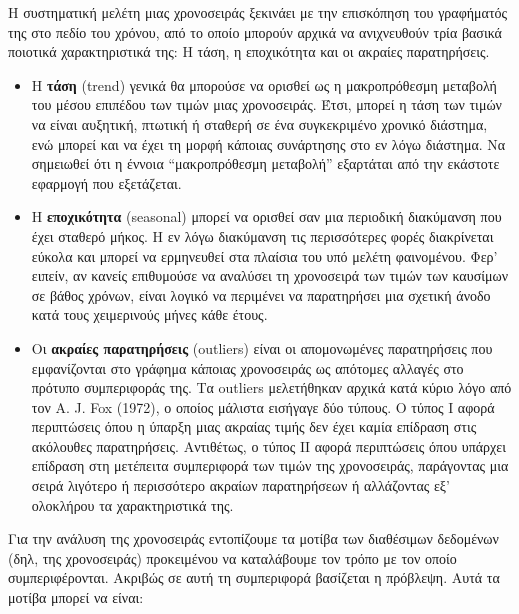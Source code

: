 Η συστηματική μελέτη μιας χρονοσειράς ξεκινάει με την επισκόπηση του
γραφήματός της στο πεδίο του χρόνου, από το οποίο μπορούν αρχικά να ανιχνευθούν
τρία βασικά ποιοτικά χαρακτηριστικά της: Η τάση, η εποχικότητα και οι ακραίες
παρατηρήσεις.\\
\begin{itemize}

\item Η \textbf{τάση} (trend) γενικά θα μπορούσε να ορισθεί ως η μακροπρόθεσμη μεταβολή του
μέσου επιπέδου των τιμών μιας χρονοσειράς. Έτσι, μπορεί η τάση των τιμών να είναι
αυξητική, πτωτική ή σταθερή σε ένα συγκεκριμένο χρονικό διάστημα, ενώ μπορεί και να
έχει τη μορφή κάποιας συνάρτησης στο εν λόγω διάστημα. Να σημειωθεί ότι η έννοια
“μακροπρόθεσμη μεταβολή” εξαρτάται από την εκάστοτε εφαρμογή που εξετάζεται.
\item Η \textbf{εποχικότητα} (seasonal) μπορεί να ορισθεί σαν μια περιοδική διακύμανση που έχει
σταθερό μήκος. Η εν λόγω διακύμανση τις περισσότερες φορές διακρίνεται εύκολα και
μπορεί να ερμηνευθεί στα πλαίσια του υπό μελέτη φαινομένου. Φερ' ειπείν, αν
κανείς επιθυμούσε να αναλύσει τη χρονοσειρά των τιμών των καυσίμων σε βάθος
χρόνων, είναι λογικό να περιμένει να παρατηρήσει μια σχετική άνοδο κατά τους
χειμερινούς μήνες κάθε έτους.

\item Οι \textbf{ακραίες παρατηρήσεις} (outliers) είναι οι απομονωμένες παρατηρήσεις που
εμφανίζονται στο γράφημα κάποιας χρονοσειράς ως απότομες αλλαγές στο πρότυπο
συμπεριφοράς της. Τα outliers μελετήθηκαν αρχικά κατά κύριο λόγο από τον A. J. Fox
(1972), ο οποίος μάλιστα εισήγαγε δύο τύπους. Ο τύπος I αφορά περιπτώσεις όπου η
ύπαρξη μιας ακραίας τιμής δεν έχει καμία επίδραση στις ακόλουθες παρατηρήσεις.
Αντιθέτως, ο τύπος ΙΙ αφορά περιπτώσεις όπου υπάρχει επίδραση στη μετέπειτα
συμπεριφορά των τιμών της χρονοσειράς, παράγοντας μια σειρά λιγότερο ή περισσότερο
ακραίων παρατηρήσεων ή αλλάζοντας εξ’ ολοκλήρου τα χαρακτηριστικά της.
\end{itemize}
Για την ανάλυση της χρονοσειράς εντοπίζουμε τα μοτίβα των διαθέσιμων δεδομένων
(δηλ, της χρονοσειράς) προκειμένου να καταλάβουμε τον τρόπο με τον οποίο
συμπεριφέρονται. Ακριβώς σε αυτή τη συμπεριφορά βασίζεται η πρόβλεψη. Αυτά τα
μοτίβα μπορεί να είναι:\\
